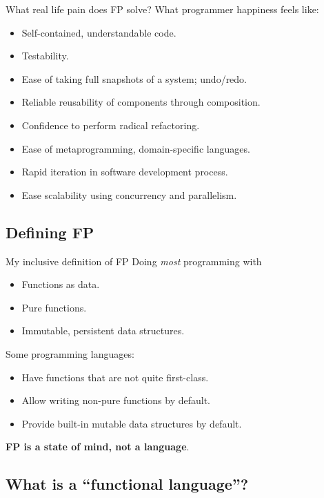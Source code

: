 \begin{frame}{What real life pain does FP solve?}
  What programmer happiness feels like:
  \begin{itemize}
  \item Self-contained, understandable code.
  \item Testability.
  \item Ease of taking full snapshots of a system; undo/redo.
  \item Reliable reusability of components through composition.
  \item Confidence to perform radical refactoring.
  \item Ease of metaprogramming, domain-specific languages.
  \item Rapid iteration in software development process.
  \item Ease scalability using concurrency and parallelism.
  \end{itemize}
\end{frame}

\subsection{Defining FP}

\begin{frame}{My inclusive definition of FP}
  Doing \emph{most} programming with
  \begin{itemize}
  \item Functions as data.
  \item Pure functions.
  \item Immutable, persistent data structures.
  \end{itemize}

  Some programming languages:
  \begin{itemize}
  \item Have functions that are not quite first-class.
  \item Allow writing non-pure functions by default.
  \item Provide built-in mutable data structures by default.
  \end{itemize}

  \textbf{FP is a state of mind, not a language}.
\end{frame}

\subsection{What is a ``functional language''?}

